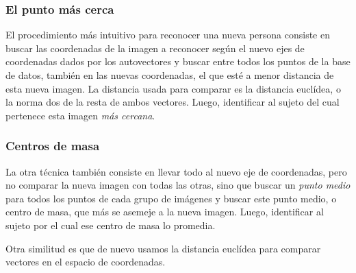 \subsubsection{El punto más cerca}
El procedimiento más intuitivo para reconocer una nueva persona consiste en buscar las coordenadas
de la imagen a reconocer según el nuevo ejes de coordenadas dados por los autovectores y buscar
entre todos los puntos de la base de datos, también en las nuevas coordenadas, el que esté a menor
distancia de esta nueva imagen. La distancia usada para comparar es la distancia euclídea, o la
norma dos de la resta de ambos vectores. Luego, identificar al sujeto del cual pertenece esta imagen
\textit{más cercana}.

\subsubsection{Centros de masa}
La otra técnica también consiste en llevar todo al nuevo eje de coordenadas, pero no comparar la
nueva imagen con todas las otras, sino que buscar un \textit{punto medio} para todos los puntos de
cada grupo de imágenes y buscar este punto medio, o centro de masa, que más se asemeje a la nueva
imagen. Luego, identificar al sujeto por el cual ese centro de masa lo promedia.

Otra similitud es que de nuevo usamos la distancia euclídea para comparar vectores en el espacio de
coordenadas.
